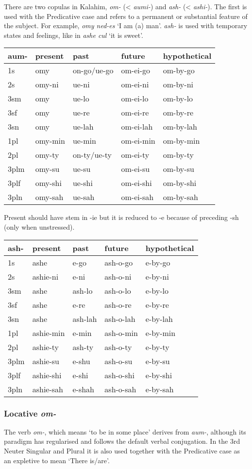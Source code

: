 \documentclass[a4paper,]{article}
\begin{document}
There are two copulas in Kalahim, \emph{om-} (\textless{} \emph{aumi-})
and \emph{ash-} (\textless{} \emph{ashi-}). The first is used with the
Predicative case and refers to a permanent or substantial feature of the
subject. For example, \emph{omy ned-es} `I am (a) man'. \emph{ash-} is
used with temporary states and feelings, like in \emph{ashe cul} `it is
sweet'.

\begin{longtable}[]{@{}lllll@{}}
\toprule
aum- & present & past & future & hypothetical\tabularnewline
\midrule
\endhead
1s & omy & on-go/ue-go & om-ei-go & om-by-go\tabularnewline
2s & omy-ni & ue-ni & om-ei-ni & om-by-ni\tabularnewline
3sm & omy & ue-lo & om-ei-lo & om-by-lo\tabularnewline
3sf & omy & ue-re & om-ei-re & om-by-re\tabularnewline
3sn & omy & ue-lah & om-ei-lah & om-by-lah\tabularnewline
1pl & omy-min & ue-min & om-ei-min & om-by-min\tabularnewline
2pl & omy-ty & on-ty/ue-ty & om-ei-ty & om-by-ty\tabularnewline
3plm & omy-su & ue-su & om-ei-su & om-by-su\tabularnewline
3plf & omy-shi & ue-shi & om-ei-shi & om-by-shi\tabularnewline
3pln & omy-sah & ue-sah & om-ei-sah & om-by-sah\tabularnewline
\bottomrule
\end{longtable}

Present should have stem in -ie but it is reduced to -e because of
preceding -sh (only when unstressed).

\begin{longtable}[]{@{}lllll@{}}
\toprule
ash- & present & past & future & hypothetical\tabularnewline
\midrule
\endhead
1s & ashe & e-go & ash-o-go & e-by-go\tabularnewline
2s & ashie-ni & e-ni & ash-o-ni & e-by-ni\tabularnewline
3sm & ashe & ash-lo & ash-o-lo & e-by-lo\tabularnewline
3sf & ashe & e-re & ash-o-re & e-by-re\tabularnewline
3sn & ashe & ash-lah & ash-o-lah & e-by-lah\tabularnewline
1pl & ashie-min & e-min & ash-o-min & e-by-min\tabularnewline
2pl & ashie-ty & ash-ty & ash-o-ty & e-by-ty\tabularnewline
3plm & ashie-su & e-shu & ash-o-su & e-by-su\tabularnewline
3plf & ashie-shi & e-shi & ash-o-shi & e-by-shi\tabularnewline
3pln & ashie-sah & e-shah & ash-o-sah & e-by-sah\tabularnewline
\bottomrule
\end{longtable}

\hypertarget{locative-om-}{%
\subsubsection{\texorpdfstring{Locative
\emph{om-}}{Locative om-}}\label{locative-om-}}

The verb \emph{om-}, which means `to be in some place' derives from
\emph{aum-}, although its paradigm has regularised and follows the
default verbal conjugation. In the 3rd Neuter Singular and Plural it is
also used together with the Predicative case as an expletive to mean
`There is/are'.
\end{document}
